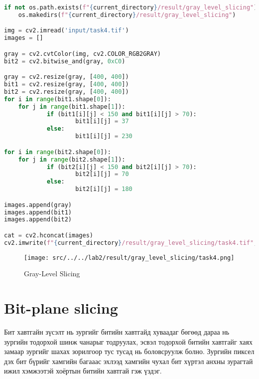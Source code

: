 \begin{lstlisting}[language=Python, caption=Gray-Level Slicing, frame=single]
	if not os.path.exists(f"{current_directory}/result/gray_level_slicing"):
	os.makedirs(f"{current_directory}/result/gray_level_slicing")

img = cv2.imread('input/task4.tif')
images = []

gray = cv2.cvtColor(img, cv2.COLOR_RGB2GRAY)
bit2 = cv2.bitwise_and(gray, 0xC0)

gray = cv2.resize(gray, [400, 400])
bit1 = cv2.resize(gray, [400, 400])
bit2 = cv2.resize(gray, [400, 400])
for i in range(bit1.shape[0]):
	for j in range(bit1.shape[1]):
			if (bit1[i][j] < 150 and bit1[i][j] > 70):
					bit1[i][j] = 37
			else:
					bit1[i][j] = 230

for i in range(bit2.shape[0]):
	for j in range(bit2.shape[1]):
			if (bit2[i][j] < 150 and bit2[i][j] > 70):
					bit2[i][j] = 70
			else:
					bit2[i][j] = 180

images.append(gray)
images.append(bit1)
images.append(bit2)

cat = cv2.hconcat(images)
cv2.imwrite(f"{current_directory}/result/gray_level_slicing/task4.tif", cat)
\end{lstlisting}

\begin{figure}
	\centering
	\texttt{[image: src/../../lab2/result/gray\_level\_slicing/task4.png]}
	\caption{Gray-Level Slicing}
\end{figure}

\pagebreak

\section{Bit-plane slicing}

Бит хавтгайн зүсэлт нь зургийг битийн хавтгайд хуваадаг бөгөөд дараа нь зургийн тодорхой шинж чанарыг тодруулах, эсвэл тодорхой битийн хавтгайг хаях замаар зургийг шахах зорилгоор тус тусад нь боловсруулж болно. Зургийн пиксел дэх бит бүрийг хамгийн багааас эхлээд хамгийн чухал бит хүртэл анхны зурагтай ижил хэмжээтэй хоёртын битийн хавтгай гэж үздэг.

